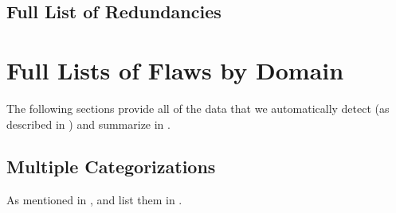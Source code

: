 \subsection{Full List of Redundancies}\label{redun-full}


\section{Full Lists of Flaws by Domain}\label{flawDmn-full}

The following sections provide all of the data that we automatically detect
(as described in ) and summarize in .

\subsection{Multiple Categorizations}\label{multiCats-full}

As mentioned in , \multiCatIntro{} and list them in
.

\begin{landscape}
    
\end{landscape}

